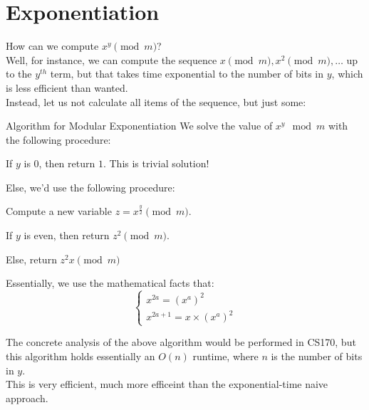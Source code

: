 \section{Exponentiation}
How can we compute $x^y\pmod{m}$? \\
Well, for instance, we can compute the sequence $x\pmod{m}, x^2\pmod{m}, \dots$ up to the $y^{th}$ term, but that takes time exponential to the number of bits in $y$, which is less efficient than wanted. \\
Instead, let us not calculate all items of the sequence, but just some:
\begin{ln-theorem}{Algorithm for Modular Exponentiation}{}
    We solve the value of $x^y \mod{m}$ with the following procedure:
    \begin{bindenum}
        \item If $y$ is $0$, then return $1$. This is trivial solution!
        \item {
            Else, we'd use the following procedure:
            \begin{bindenum}
                \item Compute a new variable $z = x^{\frac{y}{2}}\pmod{m}$.
                \item If $y$ is even, then return $z^2\pmod{m}$.
                \item Else, return $z^2x\pmod{m}$
            \end{bindenum}
        }
    \end{bindenum}
    Essentially, we use the mathematical facts that:
    \[
        \begin{cases}
            x^{2a} = {(x^a)}^2 \\
            x^{2a + 1} = x \times {(x^a)}^2
        \end{cases}
    \]
\end{ln-theorem}
The concrete analysis of the above algorithm would be performed in CS170, but this algorithm holds essentially an $O(n)$ runtime, where $n$ is the number of bits in $y$. \\
This is very efficient, much more efficeint than the exponential-time naive approach.

